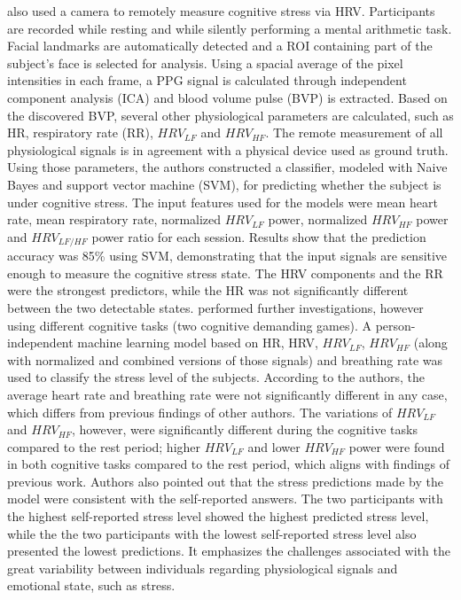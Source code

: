 \textcite{mcduff2014remote} also used a camera to remotely measure cognitive stress via HRV. Participants are recorded while resting and while silently performing a mental arithmetic task. Facial landmarks are automatically detected and a ROI containing part of the subject's face is selected for analysis. Using a spacial average of the pixel intensities in each frame, a PPG signal is calculated through independent component analysis (ICA) and blood volume pulse (BVP) is extracted. Based on the discovered BVP, several other physiological parameters are calculated, such as HR, respiratory rate (RR), $HRV_{LF}$ and $HRV_{HF}$. The remote measurement of all physiological signals is in agreement with a physical device used as ground truth. Using those parameters, the authors constructed a classifier, modeled with Naive Bayes and support vector machine (SVM), for predicting whether the subject is under cognitive stress. The input features used for the models were mean heart rate, mean respiratory rate, normalized $HRV_{LF}$ power, normalized $HRV_{HF}$ power and $HRV_{LF/HF}$ power ratio for each session. Results show that the prediction accuracy was 85\% using SVM, demonstrating that the input signals are sensitive enough to measure the cognitive stress state. The HRV components and the RR were the strongest predictors, while the HR was not significantly different between the two detectable states. \textcite{mcduffcogcam} performed further investigations, however using different cognitive tasks (two cognitive demanding games). A person-independent machine learning model based on HR, HRV, $HRV_{LF}$, $HRV_{HF}$ (along with normalized and combined versions of those signals) and breathing rate was used to classify the stress level of the subjects. According to the authors, the average heart rate and breathing rate were not significantly different in any case, which differs from previous findings of other authors. The variations of $HRV_{LF}$ and $HRV_{HF}$, however, were significantly different during the cognitive tasks compared to the rest period; higher $HRV_{LF}$ and lower $HRV_{HF}$ power were found in both cognitive tasks compared to the rest period, which aligns with findings of previous work. Authors also pointed out that the stress predictions made by the model were consistent with the self-reported answers. The two participants with the highest self-reported stress level showed the highest predicted stress level, while the the two participants with the lowest self-reported stress level also presented the lowest predictions. It emphasizes the challenges associated with the great variability between individuals regarding physiological signals and emotional state, such as stress.

